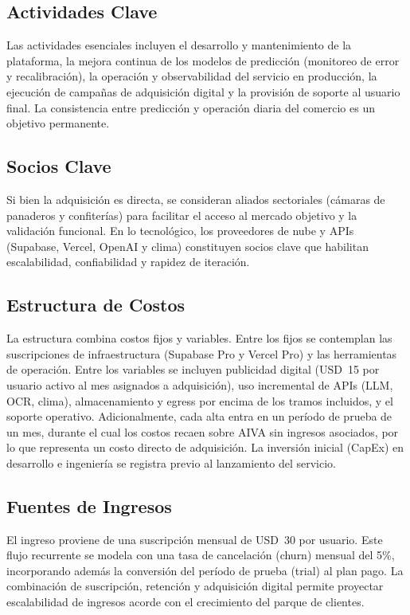 \subsection{Actividades Clave}
Las actividades esenciales incluyen el desarrollo y mantenimiento de la plataforma, la mejora continua de los modelos de predicción (monitoreo de error y recalibración), la operación y observabilidad del servicio en producción, la ejecución de campañas de adquisición digital y la provisión de soporte al usuario final. La consistencia entre predicción y operación diaria del comercio es un objetivo permanente.

\subsection{Socios Clave}
Si bien la adquisición es directa, se consideran aliados sectoriales (cámaras de panaderos y confiterías) para facilitar el acceso al mercado objetivo y la validación funcional. En lo tecnológico, los proveedores de nube y APIs (Supabase, Vercel, OpenAI y clima) constituyen socios clave que habilitan escalabilidad, confiabilidad y rapidez de iteración.

\subsection{Estructura de Costos}
La estructura combina costos fijos y variables. Entre los fijos se contemplan las suscripciones de infraestructura (Supabase Pro y Vercel Pro) y las herramientas de operación. Entre los variables se incluyen publicidad digital (USD~15 por usuario activo al mes asignados a adquisición), uso incremental de APIs (LLM, OCR, clima), almacenamiento y egress por encima de los tramos incluidos, y el soporte operativo. Adicionalmente, cada alta entra en un período de prueba de un mes, durante el cual los costos recaen sobre AIVA sin ingresos asociados, por lo que representa un costo directo de adquisición. La inversión inicial (CapEx) en desarrollo e ingeniería se registra previo al lanzamiento del servicio.

\subsection{Fuentes de Ingresos}
El ingreso proviene de una suscripción mensual de USD~30 por usuario. Este flujo recurrente se modela con una tasa de cancelación (churn) mensual del 5\%, incorporando además la conversión del período de prueba (trial) al plan pago. La combinación de suscripción, retención y adquisición digital permite proyectar escalabilidad de ingresos acorde con el crecimiento del parque de clientes.

